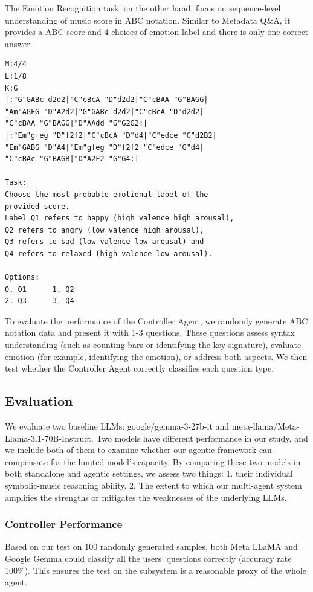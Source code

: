 \documentclass[sigconf]{acmart}
\begin{document}
The Emotion Recognition task, on the other hand, focus on sequence-level understanding of music score in ABC notation. Similar to Metadata Q\&A, it provides a ABC score and 4 choices of emotion label and there is only one correct answer.

\begin{tcolorbox}[title=Emotion Recognition, colback=gray!10, colframe=gray!60, listing only]
\begin{verbatim}
M:4/4
L:1/8
K:G
|:"G"GABc d2d2|"C"cBcA "D"d2d2|"C"cBAA "G"BAGG|
"Am"AGFG "D"A2d2|"G"GABc d2d2|"C"cBcA "D"d2d2|
"C"cBAA "G"BAGG|"D"AAdd "G"G2G2:|
|:"Em"gfeg "D"f2f2|"C"cBcA "D"d4|"C"edce "G"d2B2|
"Em"GABG "D"A4|"Em"gfeg "D"f2f2|"C"edce "G"d4|
"C"cBAc "G"BAGB|"D"A2F2 "G"G4:|

Task:
Choose the most probable emotional label of the 
provided score. 
Label Q1 refers to happy (high valence high arousal), 
Q2 refers to angry (low valence high arousal), 
Q3 refers to sad (low valence low arousal) and 
Q4 refers to relaxed (high valence low arousal).

Options:
0. Q1      1. Q2
2. Q3      3. Q4
\end{verbatim}
\end{tcolorbox}

To evaluate the performance of the Controller Agent, we randomly generate ABC notation data and present it with 1-3 questions. These questions assess syntax understanding (such as counting bars or identifying the key signature), evaluate emotion (for example, identifying the emotion), or address both aspects. We then test whether the Controller Agent correctly classifies each question type.

\subsection{Evaluation}
We evaluate two baseline LLMs: google/gemma-3-27b-it and meta-llama/Meta-Llama-3.1-70B-Instruct.
Two models have different performance in our study, and we include both of them to examine whether our agentic framework can compensate for the limited model's capacity. By comparing these two models in both standalone and agentic settings, we assess two things: 1. their individual symbolic-music reasoning ability. 2. The extent to which our multi-agent system amplifies the strengths or mitigates the weaknesses of the underlying LLMs.

\subsubsection{Controller Performance}
Based on our test on 100 randomly generated samples, both Meta LLaMA and Google Gemma could classify all the users' questions correctly (accuracy rate 100\%). This ensures the test on the subsystem is a reasonable proxy of the whole agent.
\end{document}
